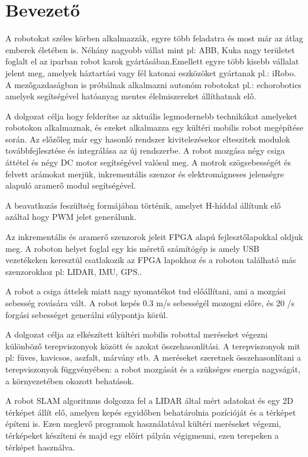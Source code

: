 \chapter{Bevezető}
A robotokat széles körben alkalmazzák, egyre több feladatra és most már az átlag emberek életében is. Néhány nagyobb vállat mint pl: ABB, Kuka nagy területet foglalt el az iparban robot karok gyártásában.Emellett egyre több kisebb vállalat jelent meg, amelyek háztartási vagy fél katonai eszközöket gyártanak pl.: iRobo. A mezőgazdaságban is próbálnak alkalmazni autonóm robotokat pl.: echorobotics amelyek segítségével hatóanyag mentes élelmiszereket állíthatnak elő.

A dolgozat célja hogy felderítse az aktuális legmodernebb technikákat amelyeket robotokon alkalmaznak, és ezeket alkalmazza egy kültéri mobilis robot megépítése során.
Az előzőleg már egy hasonló rendszer kivitelezésekor elteszitek modulok továbbfejlesztése és integrálása az új rendszerbe. A robot mozgása négy csiga áttétel és négy DC motor segítségével valósul meg. A motrok szögsebességét és  felvett arámokat merjük, inkrementális szenzor és elektromágneses jelenségre alapuló aramerő modul segítségével.

A beavatkozás feszültség formájában történik, amelyet H-híddal állítunk elő azáltal hogy PWM jelet generálunk.

Az inkrementális és aramerő szenzorok jeleit FPGA alapú fejlesztőlapokkal oldjuk meg. A roboton helyet foglal egy kis méretű számítógép is amely USB vezetékeken keresztül csatlakozik az FPGA lapokhoz és a roboton található más szenzorokhoz pl: LIDAR, IMU, GPS..

A robot a csiga áttelek miatt nagy nyomatékot tud előállítani, ami a mozgási sebesség rovására vált. A robot kepés 0.3 m/s sebességél mozogni előre, és 20 \degree/s forgási sebességet generálni súlypontja körül.

A dolgozat célja az elkészített kültéri mobilis robottal meréseket végezni különböző terepviszonyok között és azokat összehasonlítási. A terepviszonyok mit pl: füves, kavicsos, aszfalt, márvány stb. A meréseket szeretnek összehasonlítani a terepviszonyok függvényében: a robot mozgását és a szükséges energia nagyságát, a környezetében okozott behatások.

A robot SLAM algoritmus  dolgozza fel a LIDAR által mért adatokat és egy 2D térképet állít elő, amelyen kepés egyidőben behatárolnia pozícióját és a térképet építeni is. Ezen meglevő programok használatával kültéri meréseket végezni, térképeket készíteni és majd egy előírt pályán végigmenni, ezen terepeken a térképet használva.

